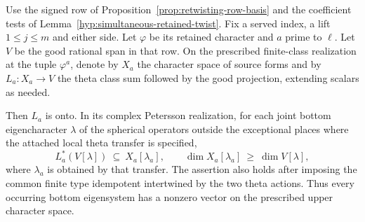 \begin{auxlemma}\label{lem:new-ray-type-occurrence}
Use the signed row of Proposition~\ref{prop:retwisting-row-basis} and the
coefficient tests of Lemma~\ref{hyp:simultaneous-retained-twist}.
Fix a served index, a lift \(1\le j\le m\) and either side. Let
\(\varphi\) be its retained character and \(a\) prime to \(\ell\).
Let \(V\) be the good rational span in that row. On the prescribed
finite-class realization at the tuple \(\varphi^a\), denote by \(X_a\)
the character space of source forms and by \(L_a:X_a\to V\) the theta
class sum followed by the good projection, extending scalars as needed.

Then \(L_a\) is onto. In its complex Petersson realization, for
each joint bottom eigencharacter \(\lambda\) of the spherical operators
outside the exceptional places where the attached local theta
transfer is specified,
\[
 L_a^*(V[\lambda])\ \subseteq\ X_a[\lambda_a],\qquad
 \dim X_a[\lambda_a]\ \geq\ \dim V[\lambda],
\]
where \(\lambda_a\) is obtained by that transfer. The assertion also
holds after imposing the common finite type idempotent intertwined by
the two theta actions. Thus every occurring bottom eigensystem has a
nonzero vector on the prescribed upper character space.
\end{auxlemma}
